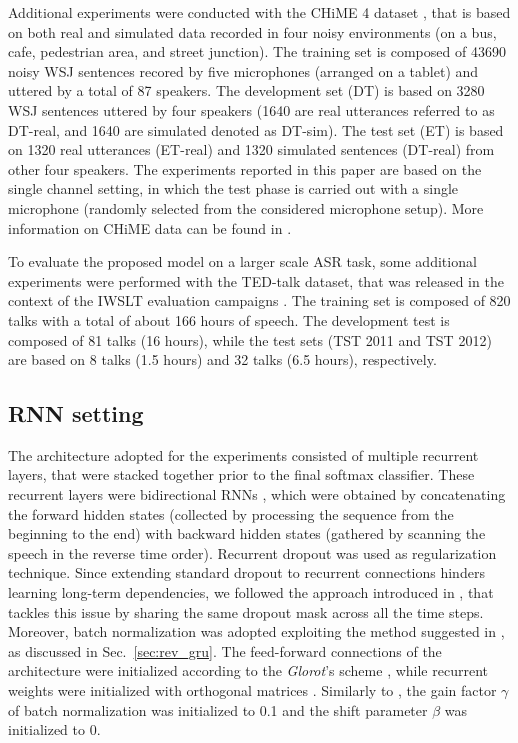 \documentclass[journal]{IEEEtran}
\begin{document}
Additional experiments were conducted with the CHiME 4 dataset \cite{chime4_paper}, that is based on both real and simulated data recorded in four noisy environments (on a bus, cafe, pedestrian area, and street junction). The training set is composed of 43690 noisy WSJ sentences recored by five microphones (arranged on a tablet) and uttered by a total of 87 speakers. The development set (DT) is based on 3280 WSJ sentences uttered by four speakers (1640 are real utterances referred to as DT-real, and 1640 are simulated denoted as DT-sim). 
The test set (ET) is based on  1320 real utterances (ET-real) and 1320 simulated sentences (DT-real) from other four speakers. The experiments reported in this paper are based on the single channel setting, in which the test phase is carried out with a single microphone (randomly selected from the considered microphone setup). 
More information on CHiME data can be found in \cite{chime3}.

To evaluate the proposed model on a larger scale ASR task, some  additional experiments were performed with the TED-talk dataset, that was released in the context of the IWSLT evaluation campaigns \cite{iwslt_2011}. The training set is composed of 820 talks with a total of about 166 hours of speech. The development test is composed of 81 talks (16 hours), while the test sets (TST 2011 and TST 2012) are based on 8 talks (1.5 hours) and 32 talks (6.5 hours), respectively.



\subsection{RNN setting} \label{sec:rnn_setup}
The architecture adopted for the experiments consisted of multiple recurrent layers, that were stacked together prior to the final softmax classifier. These recurrent layers were bidirectional RNNs \cite{graves}, which were obtained by concatenating the forward hidden states (collected by processing the sequence from the beginning to the end) with backward hidden states (gathered by scanning the speech in the reverse time order).
Recurrent dropout was used as regularization technique. Since extending standard dropout to recurrent connections hinders learning long-term dependencies, we followed the approach introduced in \cite{drop_asru,Gal2016}, that tackles this issue by sharing the same dropout mask across all the time steps. Moreover,  batch normalization was adopted exploiting the method suggested in \cite{cesar}, as discussed in Sec.~\ref{sec:rev_gru}.
The feed-forward connections of the architecture were initialized according to the \textit{Glorot}'s scheme \cite{xavier}, while recurrent weights were initialized with orthogonal matrices \cite{orth_init}. Similarly to \cite{ravanelli_SLT}, the gain factor $\gamma$ of batch normalization was initialized to 0.1 and the shift parameter $\beta$ was initialized to 0.
\end{document}
